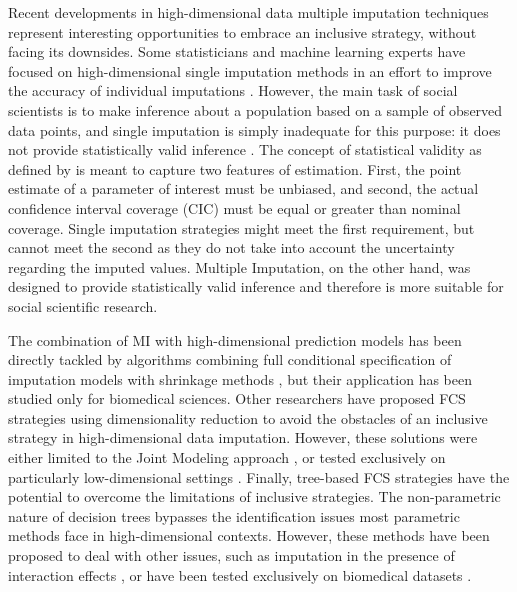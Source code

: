 Recent developments in high-dimensional data multiple imputation techniques represent interesting 
opportunities to embrace an inclusive strategy, without facing its downsides.
Some statisticians and machine learning experts have focused on high-dimensional single imputation methods in an effort to 
improve the accuracy of individual imputations \citep[e.g.][]{kimEtAl:2005, stekhovenBuhlmann:2011, d'ambrosioEtAl:2012}. 
However, the main task of social scientists is to make inference about a population based on a sample of observed 
data points, and single imputation is simply inadequate for this purpose: it does not provide statistically valid 
inference \citep{rubin:1996}.
The concept of statistical validity as defined by \citep{rubin:1996} is meant to capture two features of 
estimation.
First, the point estimate of a parameter of interest must be unbiased, and second, the actual 
confidence interval coverage (CIC) must be equal or greater than nominal coverage.
Single imputation strategies might meet the first requirement, but cannot meet the second as they 
do not take into account the uncertainty regarding the imputed values.
Multiple Imputation, on the other hand, was designed to provide statistically valid inference and therefore is 
more suitable for social scientific research.

The combination of MI with high-dimensional prediction models has been directly tackled by algorithms combining 
full conditional specification of imputation models with shrinkage methods \citep{zhaoLong:2016, dengEtAl:2016},
but their application has been studied only for biomedical sciences.
Other researchers have proposed FCS strategies using dimensionality reduction to avoid the obstacles of an inclusive
strategy in high-dimensional data imputation.
However, these solutions were either limited to the Joint Modeling approach \citep{songBelin:2004}, 
or tested exclusively on particularly low-dimensional settings \citep{howardEtAl:2015}.
Finally, tree-based FCS strategies have the potential to overcome the limitations of inclusive strategies.
The non-parametric nature of decision trees bypasses the identification issues most parametric methods face
in high-dimensional contexts.
However, these methods have been proposed to deal with other issues, such as imputation in the presence
of interaction effects \citep{dooveEtAl:2014}, or have been tested exclusively on biomedical datasets 
\citep{shahEtAl:2014}.
%
